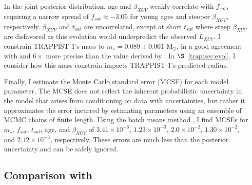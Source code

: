 In the joint posterior distribution, age and $\beta_{XUV}$ weakly correlate with $f_{sat}$, requiring a narrow spread of $f_{sat} \approx -3.05$ for young ages and steeper $\beta_{XUV}$, respectively. $\beta_{XUV}$ and $t_{sat}$ are uncorrelated, except at short $t_{sat}$ where steep $\beta_{XUV}$ are disfavored as this evolution would underpredict the observed $L_{XUV}$. I constrain TRAPPIST-1's mass to $m_{\star} = 0.089 \pm{0.001}$ M$_{\odot}$, in a good agreement with and $6\times$ more precise than the value derived by \citet{vanGrootel2018}. In $\S$~\ref{trap:sec:evol}, I consider how this mass constrain impacts TRAPPIST-1's predicted radius.

Finally, I estimate the Monte Carlo standard error (MCSE) for each model parameter. The MCSE does not reflect the inherent probabilistic uncertainty in the model that arises from conditioning on data with uncertainties, but rather it approximates the error incurred by estimating parameters using an ensemble of MCMC chains of finite length. Using the batch means method \citep{Flegal2008,Flegal2010}, I find MCSEs for $m_{\star}$, $f_{sat}$, $t_{sat}$, age, and $\beta_{XUV}$ of $3.41 \times 10^{-6}$, $1.23 \times 10^{-3}$, $2.0 \times 10^{-2}$, $1.30 \times 10^{-2}$, and $2.12 \times 10^{-3}$, respectively. These errors are much less than the posterior uncertainty and can be safely ignored.


\subsection{Comparison with \approxposterior} \label{trap:sec:approx}



